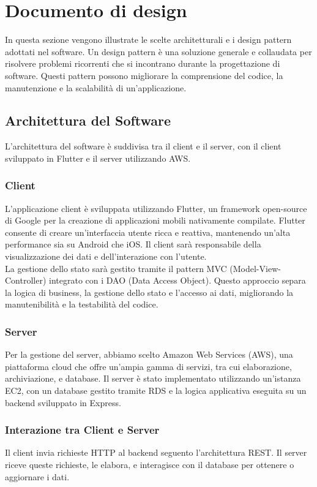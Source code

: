 \chapter{Documento di design}
In questa sezione vengono illustrate le scelte architetturali e i design pattern adottati nel software.
Un design pattern è una soluzione generale e collaudata per risolvere problemi ricorrenti che si incontrano durante la progettazione di software.
Questi pattern possono migliorare la comprensione del codice, la manutenzione e la scalabilità di un'applicazione.

\bigskip\bigskip

\section{Architettura del Software}
L'architettura del software è suddivisa tra il client e il server, con il client sviluppato in Flutter e il server utilizzando AWS.

\subsection{Client}
L'applicazione client è sviluppata utilizzando Flutter, un framework open-source di Google per la creazione di applicazioni mobili nativamente compilate. Flutter consente di creare un'interfaccia utente ricca e reattiva, mantenendo un'alta performance sia su Android che iOS.\meskip
Il client sarà responsabile della visualizzazione dei dati e dell'interazione con l'utente.\\
La gestione dello stato sarà gestito tramite il pattern MVC (Model-View-Controller) integrato con i DAO (Data Access Object).
Questo approccio separa la logica di business, la gestione dello stato e l'accesso ai dati, migliorando la manutenibilità e la testabilità del codice.

\subsection{Server}
Per la gestione del server, abbiamo scelto Amazon Web Services (AWS), una piattaforma cloud che offre un'ampia gamma di servizi, tra cui elaborazione, archiviazione, e database.
Il server è stato implementato utilizzando un'istanza EC2, con un database gestito tramite RDS e la logica applicativa eseguita su un backend sviluppato in Express.


\subsection{Interazione tra Client e Server}
Il client invia richieste HTTP al backend seguento l'architettura REST. Il server riceve queste richieste, le elabora, e interagisce con il database per ottenere o aggiornare i dati.

